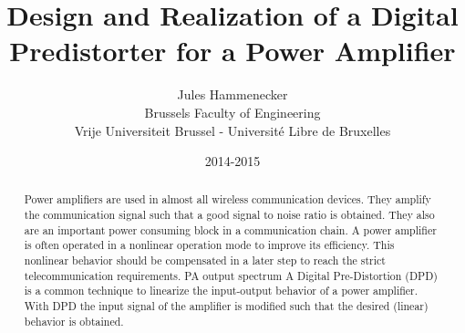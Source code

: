 \documentclass[a4paper]{report}
\begin{document}
\title{Design and Realization of a Digital Predistorter for a Power Amplifier}

\author{Jules Hammenecker \\ Brussels Faculty of Engineering \\ Vrije Universiteit Brussel - Universit\'e Libre de Bruxelles}
\date{2014-2015 }

\maketitle
\begin{abstract}
Power amplifiers are used in almost all wireless communication devices. They amplify the communication signal such that a good signal to noise ratio is obtained. They also are an important power consuming block in a communication chain. A power amplifier is often operated in a nonlinear operation mode to improve its efficiency. This nonlinear behavior should be compensated in a later step to reach the strict telecommunication requirements.
PA output spectrum
A Digital Pre-Distortion (DPD) is a common technique to linearize the input-output behavior of a power amplifier. With DPD the input signal of the amplifier is modified such that the desired (linear) behavior is obtained. 
\end{abstract}

\tableofcontents


\end{document}
